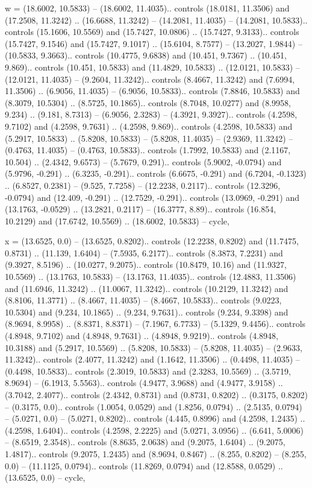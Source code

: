 w = {(18.6002, 10.5833) -- (18.6002, 11.4035).. controls (18.0181, 11.3506) and (17.2508, 11.3242) .. (16.6688, 11.3242) -- (14.2081, 11.4035) -- (14.2081, 10.5833).. controls (15.1606, 10.5569) and (15.7427, 10.0806) .. (15.7427, 9.3133).. controls (15.7427, 9.1546) and (15.7427, 9.1017) .. (15.6104, 8.7577) -- (13.2027, 1.9844) -- (10.5833, 9.3663).. controls (10.4775, 9.6838) and (10.451, 9.7367) .. (10.451, 9.869).. controls (10.451, 10.5833) and (11.4829, 10.5833) .. (12.0121, 10.5833) -- (12.0121, 11.4035) -- (9.2604, 11.3242).. controls (8.4667, 11.3242) and (7.6994, 11.3506) .. (6.9056, 11.4035) -- (6.9056, 10.5833).. controls (7.8846, 10.5833) and (8.3079, 10.5304) .. (8.5725, 10.1865).. controls (8.7048, 10.0277) and (8.9958, 9.234) .. (9.181, 8.7313) -- (6.9056, 2.3283) -- (4.3921, 9.3927).. controls (4.2598, 9.7102) and (4.2598, 9.7631) .. (4.2598, 9.869).. controls (4.2598, 10.5833) and (5.2917, 10.5833) .. (5.8208, 10.5833) -- (5.8208, 11.4035) -- (2.9369, 11.3242) -- (0.4763, 11.4035) -- (0.4763, 10.5833).. controls (1.7992, 10.5833) and (2.1167, 10.504) .. (2.4342, 9.6573) -- (5.7679, 0.291).. controls (5.9002, -0.0794) and (5.9796, -0.291) .. (6.3235, -0.291).. controls (6.6675, -0.291) and (6.7204, -0.1323) .. (6.8527, 0.2381) -- (9.525, 7.7258) -- (12.2238, 0.2117).. controls (12.3296, -0.0794) and (12.409, -0.291) .. (12.7529, -0.291).. controls (13.0969, -0.291) and (13.1763, -0.0529) .. (13.2821, 0.2117) -- (16.3777, 8.89).. controls (16.854, 10.2129) and (17.6742, 10.5569) .. (18.6002, 10.5833) -- cycle},

x = {(13.6525, 0.0) -- (13.6525, 0.8202).. controls (12.2238, 0.8202) and (11.7475, 0.8731) .. (11.139, 1.6404) -- (7.5935, 6.2177).. controls (8.3873, 7.2231) and (9.3927, 8.5196) .. (10.0277, 9.2075).. controls (10.8479, 10.16) and (11.9327, 10.5569) .. (13.1763, 10.5833) -- (13.1763, 11.4035).. controls (12.4883, 11.3506) and (11.6946, 11.3242) .. (11.0067, 11.3242).. controls (10.2129, 11.3242) and (8.8106, 11.3771) .. (8.4667, 11.4035) -- (8.4667, 10.5833).. controls (9.0223, 10.5304) and (9.234, 10.1865) .. (9.234, 9.7631).. controls (9.234, 9.3398) and (8.9694, 8.9958) .. (8.8371, 8.8371) -- (7.1967, 6.7733) -- (5.1329, 9.4456).. controls (4.8948, 9.7102) and (4.8948, 9.7631) .. (4.8948, 9.9219).. controls (4.8948, 10.3188) and (5.2917, 10.5569) .. (5.8208, 10.5833) -- (5.8208, 11.4035) -- (2.9633, 11.3242).. controls (2.4077, 11.3242) and (1.1642, 11.3506) .. (0.4498, 11.4035) -- (0.4498, 10.5833).. controls (2.3019, 10.5833) and (2.3283, 10.5569) .. (3.5719, 8.9694) -- (6.1913, 5.5563).. controls (4.9477, 3.9688) and (4.9477, 3.9158) .. (3.7042, 2.4077).. controls (2.4342, 0.8731) and (0.8731, 0.8202) .. (0.3175, 0.8202) -- (0.3175, 0.0).. controls (1.0054, 0.0529) and (1.8256, 0.0794) .. (2.5135, 0.0794) -- (5.0271, 0.0) -- (5.0271, 0.8202).. controls (4.445, 0.8996) and (4.2598, 1.2435) .. (4.2598, 1.6404).. controls (4.2598, 2.2225) and (5.0271, 3.0956) .. (6.641, 5.0006) -- (8.6519, 2.3548).. controls (8.8635, 2.0638) and (9.2075, 1.6404) .. (9.2075, 1.4817).. controls (9.2075, 1.2435) and (8.9694, 0.8467) .. (8.255, 0.8202) -- (8.255, 0.0) -- (11.1125, 0.0794).. controls (11.8269, 0.0794) and (12.8588, 0.0529) .. (13.6525, 0.0) -- cycle},

